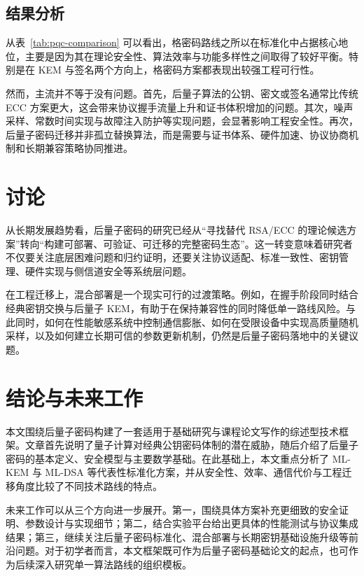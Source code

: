 ﻿\documentclass[12pt,a4paper]{ctexart}
\numberwithin{equation}{section}
\begin{document}
\subsection{结果分析}
从表~\ref{tab:pqc-comparison} 可以看出，格密码路线之所以在标准化中占据核心地位，主要是因为其在理论安全性、算法效率与功能多样性之间取得了较好平衡。特别是在 KEM 与签名两个方向上，格密码方案都表现出较强工程可行性。

然而，主流并不等于没有问题。首先，后量子算法的公钥、密文或签名通常比传统 ECC 方案更大，这会带来协议握手流量上升和证书体积增加的问题。其次，噪声采样、常数时间实现与故障注入防护等实现问题，会显著影响工程安全性。再次，后量子密码迁移并非孤立替换算法，而是需要与证书体系、硬件加速、协议协商机制和长期兼容策略协同推进。

\section{讨论}
从长期发展趋势看，后量子密码的研究已经从“寻找替代 RSA/ECC 的理论候选方案”转向“构建可部署、可验证、可迁移的完整密码生态”。这一转变意味着研究者不仅要关注底层困难问题和归约证明，还要关注协议适配、标准一致性、密钥管理、硬件实现与侧信道安全等系统层问题。

在工程迁移上，混合部署是一个现实可行的过渡策略。例如，在握手阶段同时结合经典密钥交换与后量子 KEM，有助于在保持兼容性的同时降低单一路线风险。与此同时，如何在性能敏感系统中控制通信膨胀、如何在受限设备中实现高质量随机采样，以及如何建立长期可信的参数更新机制，仍然是后量子密码落地中的关键议题。

\section{结论与未来工作}
本文围绕后量子密码构建了一套适用于基础研究与课程论文写作的综述型技术框架。文章首先说明了量子计算对经典公钥密码体制的潜在威胁，随后介绍了后量子密码的基本定义、安全模型与主要数学基础。在此基础上，本文重点分析了 ML-KEM 与 ML-DSA 等代表性标准化方案，并从安全性、效率、通信代价与工程迁移角度比较了不同技术路线的特点。

未来工作可以从三个方向进一步展开。第一，围绕具体方案补充更细致的安全证明、参数设计与实现细节；第二，结合实验平台给出更具体的性能测试与协议集成结果；第三，继续关注后量子密码标准化、混合部署与长期密钥基础设施升级等前沿问题。对于初学者而言，本文框架既可作为后量子密码基础论文的起点，也可作为后续深入研究单一算法路线的组织模板。
\end{document}
